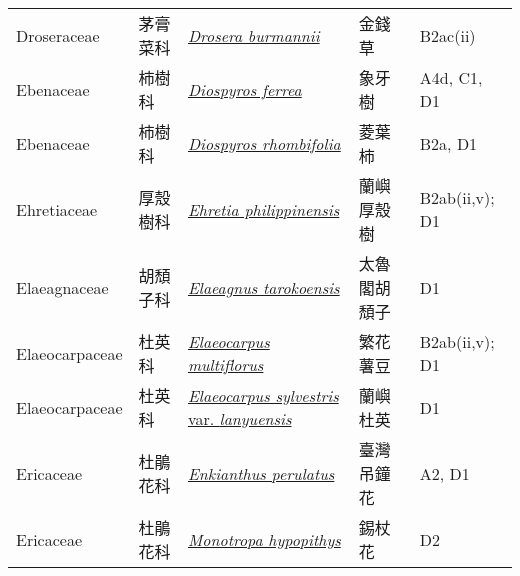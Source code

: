 {\begin{longtable}{L{2.5cm}L{2cm}L{5cm}L{2.5cm}L{3cm}}
    Droseraceae & 茅膏菜科 & \href{http://www.theplantlist.org/tpl1.1/search?q=Drosera+burmannii}{\textit{Drosera burmannii} } & 金錢草 & B2ac(ii)    \\
    Ebenaceae & 柿樹科 & \href{http://www.theplantlist.org/tpl1.1/search?q=Diospyros+ferrea}{\textit{Diospyros ferrea} } & 象牙樹 & A4d, C1, D1    \\
    Ebenaceae & 柿樹科 & \href{http://www.theplantlist.org/tpl1.1/search?q=Diospyros+rhombifolia}{\textit{Diospyros rhombifolia} } & 菱葉柿 & B2a, D1    \\
    Ehretiaceae & 厚殼樹科 & \href{http://www.theplantlist.org/tpl1.1/search?q=Ehretia+philippinensis}{\textit{Ehretia philippinensis} } & 蘭嶼厚殼樹 & B2ab(ii,v); D1    \\
    Elaeagnaceae & 胡頹子科 & \href{http://www.theplantlist.org/tpl1.1/search?q=Elaeagnus+tarokoensis}{\textit{Elaeagnus tarokoensis} } & 太魯閣胡頹子 & D1    \\
    Elaeocarpaceae & 杜英科 & \href{http://www.theplantlist.org/tpl1.1/search?q=Elaeocarpus+multiflorus}{\textit{Elaeocarpus multiflorus} } & 繁花薯豆 & B2ab(ii,v); D1    \\
    Elaeocarpaceae & 杜英科 & \href{http://www.theplantlist.org/tpl1.1/search?q=Elaeocarpus+sylvestris+var.+lanyuensis}{\textit{Elaeocarpus sylvestris} var. \textit{lanyuensis} } & 蘭嶼杜英 & D1    \\
    Ericaceae & 杜鵑花科 & \href{http://www.theplantlist.org/tpl1.1/search?q=Enkianthus+perulatus}{\textit{Enkianthus perulatus} } & 臺灣吊鐘花 & A2, D1    \\
    Ericaceae & 杜鵑花科 & \href{http://www.theplantlist.org/tpl1.1/search?q=Monotropa+hypopithys}{\textit{Monotropa hypopithys} } & 錫杖花 & D2    \\

\end{longtable}}
